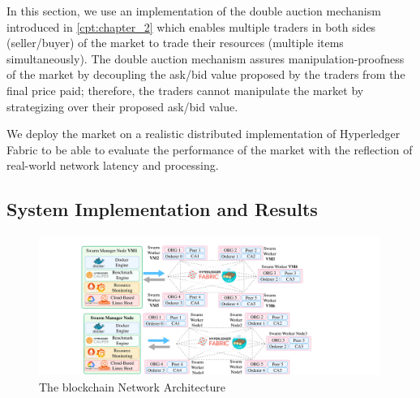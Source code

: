 
In this section, we use an implementation of the double auction mechanism introduced in \autoref{cpt:chapter_2} which enables multiple traders in both sides (seller/buyer) of the market to trade their resources (multiple items simultaneously). The double auction mechanism assures manipulation-proofness of the market by decoupling the ask/bid value proposed by the traders from the final price paid; therefore, the traders cannot manipulate the market by strategizing over their proposed ask/bid value. %

We deploy the market on a realistic distributed implementation of Hyperledger Fabric to be able to evaluate the performance of the market with the reflection of real-world network latency and processing. 





\subsection{System Implementation and Results}
\label{sec:results}

\begin{figure}[htbp]
    \centering
    \includegraphics[width=0.99\textwidth]{Figures/ICC-vms1.pdf}
    \caption{The blockchain Network Architecture}
    \label{fig:Arcitecture}
\end{figure}


